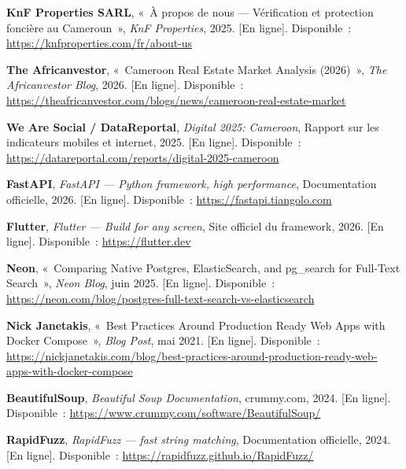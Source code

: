 \begin{enumerate}[label={[\arabic*]}, leftmargin=1.2cm, labelsep=0.3cm, itemsep=0.8em]
    \item \label{ref:knf} \textbf{KnF Properties SARL}, «~À propos de nous --- Vérification et protection foncière au Cameroun~», \textit{KnF Properties}, 2025. [En ligne]. Disponible~: \url{https://knfproperties.com/fr/about-us}

    \item \label{ref:africanvestor} \textbf{The Africanvestor}, «~Cameroon Real Estate Market Analysis (2026)~», \textit{The Africanvestor Blog}, 2026. [En ligne]. Disponible~: \url{https://theafricanvestor.com/blogs/news/cameroon-real-estate-market}

    \item \label{ref:datareportal} \textbf{We Are Social / DataReportal}, \textit{Digital 2025: Cameroon}, Rapport sur les indicateurs mobiles et internet, 2025. [En ligne]. Disponible~: \url{https://datareportal.com/reports/digital-2025-cameroon}

    \item \label{ref:fastapi} \textbf{FastAPI}, \textit{FastAPI --- Python framework, high performance}, Documentation officielle, 2026. [En ligne]. Disponible~: \url{https://fastapi.tiangolo.com}

    \item \label{ref:flutter} \textbf{Flutter}, \textit{Flutter --- Build for any screen}, Site officiel du framework, 2026. [En ligne]. Disponible~: \url{https://flutter.dev}

    \item \label{ref:postgres_es} \textbf{Neon}, «~Comparing Native Postgres, ElasticSearch, and pg\_search for Full-Text Search~», \textit{Neon Blog}, juin 2025. [En ligne]. Disponible~: \url{https://neon.com/blog/postgres-full-text-search-vs-elasticsearch}

    \item \label{ref:docker} \textbf{Nick Janetakis}, «~Best Practices Around Production Ready Web Apps with Docker Compose~», \textit{Blog Post}, mai 2021. [En ligne]. Disponible~: \url{https://nickjanetakis.com/blog/best-practices-around-production-ready-web-apps-with-docker-compose}

    \item \label{ref:beautifulsoup} \textbf{BeautifulSoup}, \textit{Beautiful Soup Documentation}, crummy.com, 2024. [En ligne]. Disponible~: \url{https://www.crummy.com/software/BeautifulSoup/}

    \item \label{ref:rapidfuzz} \textbf{RapidFuzz}, \textit{RapidFuzz --- fast string matching}, Documentation officielle, 2024. [En ligne]. Disponible~: \url{https://rapidfuzz.github.io/RapidFuzz/}


\end{enumerate}
